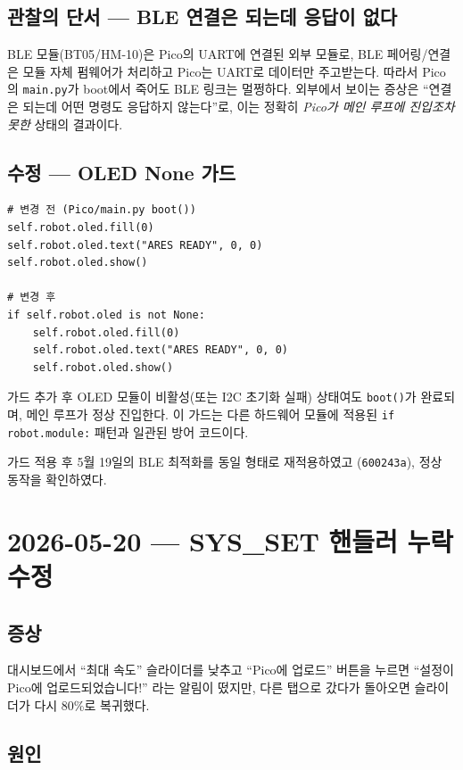 \documentclass[11pt, oneside]{article}
\begin{document}
\subsection{관찰의 단서 --- BLE 연결은 되는데 응답이 없다}

BLE 모듈(BT05/HM-10)은 Pico의 UART에 연결된 외부 모듈로, BLE
페어링/연결은 모듈 자체 펌웨어가 처리하고 Pico는 UART로 데이터만
주고받는다. 따라서 Pico의 \texttt{main.py}가 boot에서 죽어도 BLE 링크는
멀쩡하다. 외부에서 보이는 증상은 ``연결은 되는데 어떤 명령도
응답하지 않는다''로, 이는 정확히 \emph{Pico가 메인 루프에 진입조차
못한} 상태의 결과이다.

\subsection{수정 --- OLED None 가드}

\begin{verbatim}
# 변경 전 (Pico/main.py boot())
self.robot.oled.fill(0)
self.robot.oled.text("ARES READY", 0, 0)
self.robot.oled.show()

# 변경 후
if self.robot.oled is not None:
    self.robot.oled.fill(0)
    self.robot.oled.text("ARES READY", 0, 0)
    self.robot.oled.show()
\end{verbatim}

가드 추가 후 OLED 모듈이 비활성(또는 I2C 초기화 실패) 상태여도
\texttt{boot()}가 완료되며, 메인 루프가 정상 진입한다. 이 가드는 다른
하드웨어 모듈에 적용된 \texttt{if robot.module:} 패턴과 일관된
방어 코드이다.

가드 적용 후 5월 19일의 BLE 최적화를 동일 형태로 재적용하였고
(\texttt{600243a}), 정상 동작을 확인하였다.

\section{2026-05-20 --- SYS\_SET 핸들러 누락 수정}

\subsection{증상}

대시보드에서 ``최대 속도'' 슬라이더를 낮추고 ``Pico에 업로드'' 버튼을
누르면 ``설정이 Pico에 업로드되었습니다!'' 라는 알림이 떴지만, 다른
탭으로 갔다가 돌아오면 슬라이더가 다시 80\%로 복귀했다.

\subsection{원인}
\end{document}

